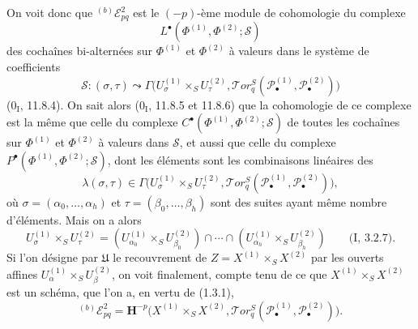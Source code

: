 On voit donc que ${}^{(b)}\mathscr E_{pq}^2$ est le $(-p)$-ème module de
cohomologie du complexe
\[
  L^\bullet(\Phi^{(1)},\Phi^{(2)};\mathscr S)
\]
des cochaînes bi-alternées sur $\Phi^{(1)}$ et $\Phi^{(2)}$ à valeurs dans le
système de coefficients
\[
  \mathscr S:(\sigma,\tau)\leadsto
  \Gamma\bigl(U_\sigma^{(1)}\times_S U_\tau^{(2)},
    \mathscr{T}\!or_q^S
    (\mathscr P_\bullet^{(1)},\mathscr P_\bullet^{(2)})\bigr)
\]
($0_{\mathrm I}$, 11.8.4). On sait alors ($0_{\mathrm I}$, 11.8.5 et 11.8.6)
que la cohomologie de ce complexe est la même que celle du complexe
$C^\bullet(\Phi^{(1)},\Phi^{(2)};\mathscr S)$ de toutes les cochaînes sur
$\Phi^{(1)}$ et $\Phi^{(2)}$ à valeurs dans $\mathscr S$, et aussi que celle du
complexe $P^\bullet(\Phi^{(1)},\Phi^{(2)};\mathscr S)$, dont les éléments sont
les combinaisons linéaires des
\[
  \lambda(\sigma,\tau)\in
  \Gamma\bigl(U_\sigma^{(1)}\times_S U_\tau^{(2)},
    \mathscr{T}\!or_q^S
    (\mathscr P_\bullet^{(1)},\mathscr P_\bullet^{(2)})\bigr),
\]
où $\sigma=(\alpha_0,\ldots,\alpha_h)$ et
$\tau=(\beta_0,\ldots,\beta_h)$ sont des suites ayant même nombre d'éléments.
Mais on a alors
\[
  U_\sigma^{(1)}\times_S U_\tau^{(2)}
  =(U_{\alpha_0}^{(1)}\times_S U_{\beta_0}^{(2)})\cap\cdots\cap
    (U_{\alpha_h}^{(1)}\times_S U_{\beta_h}^{(2)})
  \qquad\text{(I, 3.2.7)}.
\]
Si l'on désigne par $\mathfrak U$ le recouvrement de
$Z=X^{(1)}\times_S X^{(2)}$ par les ouverts affines
$U_\alpha^{(1)}\times_S U_\beta^{(2)}$, on voit finalement, compte tenu de ce
que $X^{(1)}\times_S X^{(2)}$ est un schéma, que l'on a, en vertu de (1.3.1),
\[
  {}^{(b)}\mathscr E_{pq}^2
  =\mathbf H^{-p}\bigl(X^{(1)}\times_S X^{(2)},
    \mathscr{T}\!or_q^S
    (\mathscr P_\bullet^{(1)},\mathscr P_\bullet^{(2)})\bigr).
\]

